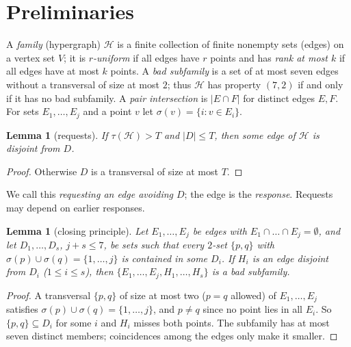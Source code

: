 \documentclass[11pt]{amsart}
\newtheorem{lemma}[theorem]{Lemma}
\theoremstyle{definition}
\theoremstyle{remark}
\newcommand{\cH}{\mathcal H}
\begin{document}
\section{Preliminaries}\label{sec:prelim}

A \emph{family} (hypergraph) $\cH$ is a finite collection of finite nonempty sets (edges) on a vertex set $V$; it is \emph{$r$-uniform} if all edges have $r$ points and has \emph{rank at most $k$} if all edges have at most $k$ points. A \emph{bad subfamily} is a set of at most seven edges without a transversal of size at most $2$; thus $\cH$ has property $(7,2)$ if and only if it has no bad subfamily. A \emph{pair intersection} is $|E\cap F|$ for distinct edges $E,F$. For sets $E_1,\dots,E_j$ and a point $v$ let $\sigma(v)=\{i:v\in E_i\}$.

\begin{lemma}[requests]\label{lem:request}
If $\tau(\cH)>T$ and $|D|\le T$, then some edge of $\cH$ is disjoint from $D$.
\end{lemma}
\begin{proof}
Otherwise $D$ is a transversal of size at most $T$.
\end{proof}
We call this \emph{requesting an edge avoiding $D$}; the edge is the \emph{response}. Requests may depend on earlier responses.

\begin{lemma}[closing principle]\label{lem:close}
Let $E_1,\dots,E_j$ be edges with $E_1\cap\dots\cap E_j=\emptyset$, and let $D_1,\dots,D_s$, $j+s\le7$, be sets such that every $2$-set $\{p,q\}$ with $\sigma(p)\cup\sigma(q)=\{1,\dots,j\}$ is contained in some $D_i$. If $H_i$ is an edge disjoint from $D_i$ ($1\le i\le s$), then $\{E_1,\dots,E_j,H_1,\dots,H_s\}$ is a bad subfamily.
\end{lemma}
\begin{proof}
A transversal $\{p,q\}$ of size at most two ($p=q$ allowed) of $E_1,\dots,E_j$ satisfies $\sigma(p)\cup\sigma(q)=\{1,\dots,j\}$, and $p\ne q$ since no point lies in all $E_i$. So $\{p,q\}\subseteq D_i$ for some $i$ and $H_i$ misses both points. The subfamily has at most seven distinct members; coincidences among the edges only make it smaller.
\end{proof}
\end{document}

